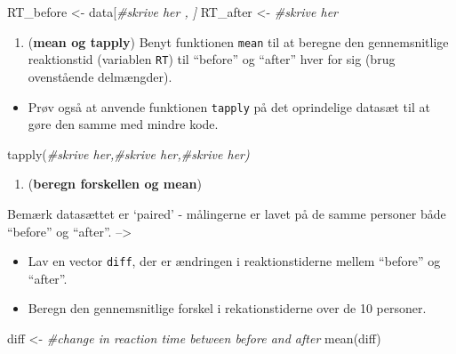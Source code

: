 \documentclass[
]{book}
\newenvironment{Shaded}{\begin{snugshade}}{\end{snugshade}}
\newcommand{\CommentTok}[1]{\textcolor[rgb]{0.56,0.35,0.01}{\textit{#1}}}
\newcommand{\FunctionTok}[1]{\textcolor[rgb]{0.00,0.00,0.00}{#1}}
\newcommand{\NormalTok}[1]{#1}
\newcommand{\OtherTok}[1]{\textcolor[rgb]{0.56,0.35,0.01}{#1}}
\providecommand{\tightlist}{%
  \setlength{\itemsep}{0pt}\setlength{\parskip}{0pt}}
\begin{document}
\begin{Shaded}
\begin{Highlighting}[]
\NormalTok{RT\_before }\OtherTok{\textless{}{-}}\NormalTok{ data[}\CommentTok{\#skrive her , ]}
\NormalTok{RT\_after }\OtherTok{\textless{}{-}} \CommentTok{\#skrive her}
\end{Highlighting}
\end{Shaded}

\begin{enumerate}
\def\labelenumi{\arabic{enumi})}
\setcounter{enumi}{10}
\tightlist
\item
  (\textbf{mean og tapply}) Benyt funktionen \texttt{mean} til at beregne den gennemsnitlige reaktionstid (variablen \texttt{RT}) til ``before'' og ``after'' hver for sig (brug ovenstående delmængder).
\end{enumerate}

\begin{itemize}
\tightlist
\item
  Prøv også at anvende funktionen \texttt{tapply} på det oprindelige datasæt til at gøre den samme med mindre kode.
\end{itemize}

\begin{Shaded}
\begin{Highlighting}[]
\FunctionTok{tapply}\NormalTok{(}\CommentTok{\#skrive her,\#skrive her,\#skrive her)}
\end{Highlighting}
\end{Shaded}

\begin{enumerate}
\def\labelenumi{\arabic{enumi})}
\setcounter{enumi}{11}
\tightlist
\item
  (\textbf{beregn forskellen og mean})
\end{enumerate}

Bemærk datasættet er `paired' - målingerne er lavet på de samme personer både ``before'' og ``after''. --\textgreater{}

\begin{itemize}
\tightlist
\item
  Lav en vector \texttt{diff}, der er ændringen i reaktionstiderne mellem ``before'' og ``after''.
\item
  Beregn den gennemsnitlige forskel i rekationstiderne over de 10 personer.
\end{itemize}

\begin{Shaded}
\begin{Highlighting}[]
\NormalTok{diff }\OtherTok{\textless{}{-}} \CommentTok{\#change in reaction time between before and after}
\FunctionTok{mean}\NormalTok{(diff)}
\end{Highlighting}
\end{Shaded}
\end{document}
